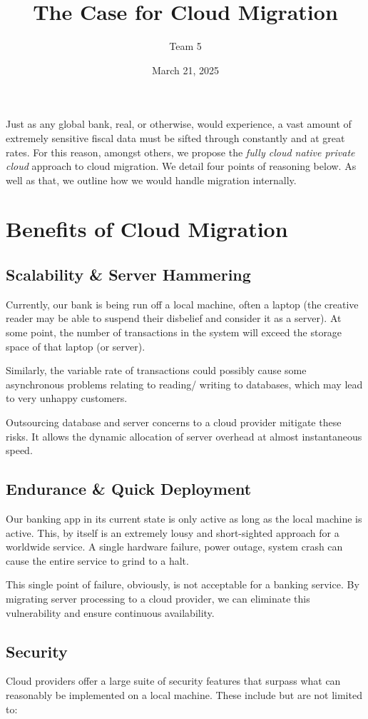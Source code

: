 \documentclass{article}
\title{The Case for Cloud Migration}
\author{Team 5}
\date{March 21, 2025}
\begin{document}
	\maketitle
	\par Just as any global bank, real, or otherwise, would experience, a vast amount of extremely sensitive fiscal data must be sifted through constantly and at great rates. For this reason, amongst others, we propose the \textit{fully cloud native private cloud} approach to cloud migration. We detail four points of reasoning below. As well as that, we outline how we would handle migration internally.
	\section{Benefits of Cloud Migration}
	\subsection{Scalability \& Server Hammering}
	\par Currently, our bank is being run off a local machine, often a laptop (the creative reader may be able to suspend their disbelief and consider it as a server). At some point, the number of transactions in the system will exceed the storage space of that laptop (or server).
	\par Similarly, the variable rate of transactions could possibly cause some asynchronous problems relating to reading/ writing to databases, which may lead to very unhappy customers.
	\par Outsourcing database and server concerns to a cloud provider mitigate these risks. It allows the dynamic allocation of server overhead at almost instantaneous speed.
	\subsection{Endurance \& Quick Deployment}
	\par Our banking app in its current state is only active as long as the local machine is active. This, by itself is an extremely lousy and short-sighted approach for a worldwide service. A single hardware failure, power outage, system crash can cause the entire service to grind to a halt.
	\par This single point of failure, obviously, is not acceptable for a banking service. By migrating server processing to a cloud provider, we can eliminate this vulnerability and ensure continuous availability.
	\subsection{Security}
	\par Cloud providers offer a large suite of security features that surpass what can reasonably be implemented on a local machine. These include but are not limited to:
\end{document}
